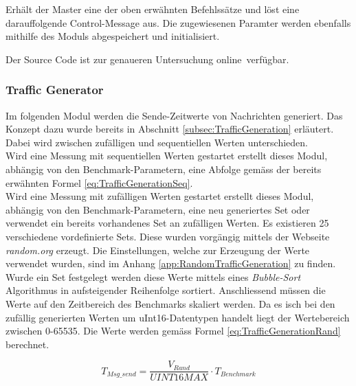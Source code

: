 Erhält der Master eine der oben erwähnten Befehlssätze und löst eine darauffolgende Control-Message aus. Die zugewiesenen Paramter werden ebenfalls mithilfe des Moduls abgespeichert und initialisiert. 

Der Source Code ist zur genaueren Untersuchung online\footnotemark\ verfügbar. 


\subsubsection{Traffic Generator}\label{subsubsec:TrafficGenerator}

Im folgenden Modul werden die Sende-Zeitwerte von Nachrichten generiert. Das Konzept dazu wurde bereits in Abschnitt \ref{subsec:TrafficGeneration} erläutert. Dabei wird zwischen zufälligen und sequentiellen Werten unterschieden.  \\

Wird eine Messung mit sequentiellen Werten gestartet erstellt dieses Modul, abhängig von den Benchmark-Parametern, eine Abfolge gemäss der bereits erwähnten Formel \ref{eq:TrafficGenerationSeq}. \\

Wird eine Messung mit zufälligen Werten gestartet erstellt dieses Modul, abhängig von den Benchmark-Parametern, eine neu generiertes Set oder verwendet ein bereits vorhandenes Set an zufälligen  Werten. Es existieren 25 verschiedene vordefinierte Sets. Diese wurden vorgängig mittels der Webseite \textit{random.org} erzeugt. Die Einstellungen, welche zur Erzeugung der Werte verwendet wurden, sind im Anhang \ref{app:RandomTrafficGeneration} zu finden. \\

Wurde ein Set festgelegt werden diese Werte mittels eines \textit{Bubble-Sort} Algorithmus in aufsteigender Reihenfolge sortiert. Anschliessend müssen die Werte auf den Zeitbereich des Benchmarks skaliert werden. Da es isch bei den zufällig generierten Werten um uInt16-Datentypen handelt liegt der Wertebereich zwischen 0-65535. Die Werte werden gemäss Formel \ref{eq:TrafficGenerationRand} berechnet. 

\begin{equation}\label{eq:TrafficGenerationRand}
T_{Msg\_send} =  \frac{V_{Rand}}{UINT16MAX} \cdot T_{Benchmark}
\end{equation}

